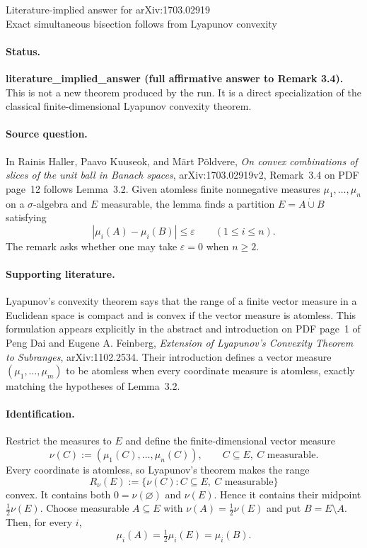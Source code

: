 \documentclass[11pt]{article}
\begin{document}
\begin{center}
{\Large Literature-implied answer for arXiv:1703.02919}\\[4pt]
{\large Exact simultaneous bisection follows from Lyapunov convexity}
\end{center}

\paragraph{Status.}
\textbf{literature\_implied\_answer (full affirmative answer to Remark 3.4).}
This is not a new theorem produced by the run.  It is a direct specialization
of the classical finite-dimensional Lyapunov convexity theorem.

\paragraph{Source question.}
In Rainis Haller, Paavo Kuuseok, and M\"art P\~oldvere,
\emph{On convex combinations of slices of the unit ball in Banach spaces},
arXiv:1703.02919v2, Remark~3.4 on PDF page~12 follows Lemma~3.2.  Given
atomless finite nonnegative measures $\mu_1,\ldots,\mu_n$ on a
$\sigma$-algebra and $E$ measurable, the lemma finds a partition
$E=A\mathbin{\dot\cup}B$ satisfying
\[
  |\mu_i(A)-\mu_i(B)|\leq\varepsilon\qquad(1\leq i\leq n).
\]
The remark asks whether one may take $\varepsilon=0$ when $n\geq2$.

\paragraph{Supporting literature.}
Lyapunov's convexity theorem says that the range of a finite vector measure in
a Euclidean space is compact and is convex if the vector measure is atomless.
This formulation appears explicitly in the abstract and introduction on PDF
page~1 of Peng Dai and Eugene A. Feinberg,
\emph{Extension of Lyapunov's Convexity Theorem to Subranges},
arXiv:1102.2534.  Their introduction defines a vector measure
$(\mu_1,\ldots,\mu_m)$ to be atomless when every coordinate measure is
atomless, exactly matching the hypotheses of Lemma~3.2.

\paragraph{Identification.}
Restrict the measures to $E$ and define the finite-dimensional vector measure
\[
  \nu(C):=(\mu_1(C),\ldots,\mu_n(C)),
  \qquad C\subseteq E,\ C\text{ measurable}.
\]
Every coordinate is atomless, so Lyapunov's theorem makes the range
\[
  R_\nu(E):=\{\nu(C): C\subseteq E,\ C\text{ measurable}\}
\]
convex.  It contains both $0=\nu(\varnothing)$ and $\nu(E)$.  Hence it
contains their midpoint $\frac12\nu(E)$.  Choose measurable $A\subseteq E$
with $\nu(A)=\frac12\nu(E)$ and put $B=E\setminus A$.  Then, for every
$i$,
\[
  \mu_i(A)=\tfrac12\mu_i(E)=\mu_i(B).
\]
\end{document}
